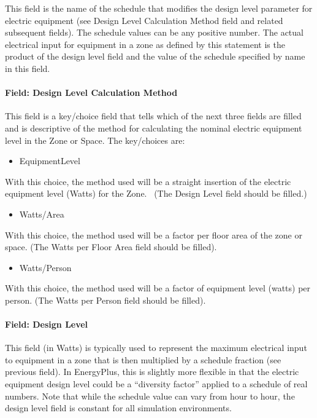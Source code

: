 This field is the name of the schedule that modifies the design level parameter for electric equipment (see Design Level Calculation Method field and related subsequent fields). The schedule values can be any positive number. The actual electrical input for equipment in a zone as defined by this statement is the product of the design level field and the value of the schedule specified by name in this field.

\paragraph{Field: Design Level Calculation Method}\label{field-design-level-calculation-method-1}

This field is a key/choice field that tells which of the next three fields are filled and is descriptive of the method for calculating the nominal electric equipment level in the Zone or Space. The key/choices are:

\begin{itemize}
\tightlist
\item
  EquipmentLevel
\end{itemize}

With this choice, the method used will be a straight insertion of the electric equipment level (Watts) for the Zone.~ (The Design Level field should be filled.)

\begin{itemize}
\tightlist
\item
  Watts/Area
\end{itemize}

With this choice, the method used will be a factor per floor area of the zone or space. (The Watts per Floor Area field should be filled).

\begin{itemize}
\tightlist
\item
  Watts/Person
\end{itemize}

With this choice, the method used will be a factor of equipment level (watts) per person. (The Watts per Person field should be filled).

\paragraph{Field: Design Level}\label{field-design-level-000}

This field (in Watts) is typically used to represent the maximum electrical input to equipment in a zone that is then multiplied by a schedule fraction (see previous field). In EnergyPlus, this is slightly more flexible in that the electric equipment design level could be a ``diversity factor'' applied to a schedule of real numbers. Note that while the schedule value can vary from hour to hour, the design level field is constant for all simulation environments.

